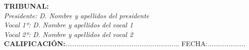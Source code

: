 \begin{flushleft}
\textbf{TRIBUNAL:}\\
\vspace{1.5cm}
\textit{Presidente: D. Nombre y apellidos del presidente}\\
\vspace{1.5cm}
\textit{Vocal 1º: D. Nombre y apellidos del vocal 1}\\
\vspace{1.5cm}
\textit{Vocal 2º: D. Nombre y apellidos del vocal 2}\\
\vspace{1.5cm}
\textbf{CALIFICACIÓN:}............................................................ FECHA:.................... \\
\end{flushleft}

\newpage
\thispagestyle{empty}
\hspace*{0.5cm}
\newpage

